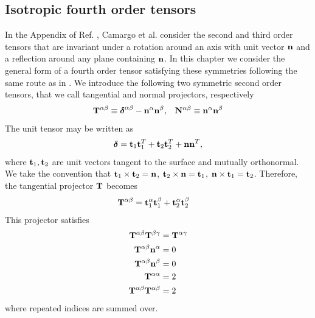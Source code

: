 \documentclass[b5paper,openright,10pt]{book}
\begin{document}
\begin{appendices}
\chapter{Isotropic fourth order tensors}
\label{Ap:Iso}
In the  Appendix of  Ref. \cite{CamargoBC2018},  Camargo et al. consider  the second  and third
order tensors that are invariant under  a rotation around an axis with
unit vector  ${\bf n}$  and a  reflection around any
plane containing ${\bf n}$. In this chapter  we consider  the general
form  of a  fourth order  tensor satisfying these symmetries following the same route as in \cite{CamargoBC2018}.
We introduce the following two
symmetric second  order tensors,  that we  call tangential  and normal
projectors, respectively
\begin{align}
  {\bf T}^{\alpha\beta}\equiv\boldsymbol{\delta}^{\alpha\beta}-{\bf n}^\alpha{\bf n}^\beta, &&
{\bf  N}^{\alpha\beta}\equiv{\bf n}^\alpha{\bf n}^\beta
\end{align}
The unit tensor may be 
written as
\begin{align}
\boldsymbol{\delta}={\bf t}_1{\bf t}_1^T+{\bf t}_2{\bf t}_2^T+{\bf n}{\bf n}^T,
\end{align}
where ${\bf  t}_1,{\bf t}_2$ are  unit vectors tangent to  the surface
and  mutually   orthonormal.   We  take  the   convention  that  ${\bf
  t}_1\times{\bf  t}_2={\bf n}$,  ${\bf t}_2\times{\bf  n}={\bf t}_1$,
${\bf     n}\times{\bf     t}_1={\bf    t}_2$.      Therefore,     the
tangential projector ${\bf T}$ becomes
\begin{align}
    {\bf T}^{\alpha\beta}&={\bf t}_1^\alpha{\bf t}_1^\beta+{\bf t}^\alpha_2{\bf t}_2^\beta
\end{align}
This projector satisfies
\begin{align}
  {\bf T}^{\alpha\beta}  {\bf T}^{\beta\gamma}&= {\bf T}^{\alpha\gamma} 
\nonumber\\
  {\bf T}^{\alpha\beta}{\bf n}^\alpha&=0
\nonumber\\
  {\bf T}^{\alpha\beta}{\bf n}^\beta&=0
\nonumber\\
  {\bf T}^{\alpha\alpha}&=2
\nonumber\\
  {\bf T}^{\alpha\beta}  {\bf T}^{\alpha\beta}&=2
\label{tprop}
\end{align}
where repeated indices are summed over. 


\end{appendices}
\end{document}
